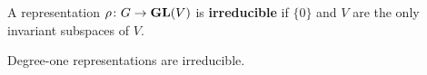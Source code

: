 
\begin{definition}
    A representation $\rho\colon G\to\mathbf{GL}(V)$ is \textbf{irreducible} if
    $\{0\}$ and $V$ are the only invariant subspaces of $V$.
\end{definition}

Degree-one representations are irreducible.

